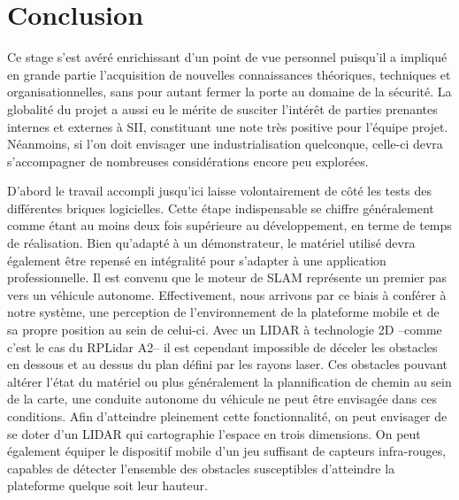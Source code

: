 \chapter*{Conclusion}

Ce stage s'est avéré enrichissant d'un point de vue personnel puisqu'il a impliqué en grande partie l'acquisition de nouvelles connaissances théoriques, techniques et organisationnelles, sans pour autant fermer la porte au 
domaine de la sécurité. 
La globalité du projet a aussi eu le mérite de susciter l'intérêt de parties prenantes internes et externes à SII, constituant une note très positive pour l'équipe projet. 
Néanmoins, si l'on doit envisager une industrialisation quelconque, celle-ci devra s'accompagner de nombreuses considérations encore peu explorées. 

D'abord le travail accompli jusqu'ici laisse volontairement de côté les tests des différentes briques logicielles.  
Cette étape indispensable se chiffre généralement comme étant au moins deux fois supérieure au développement, en terme de temps de réalisation.
Bien qu'adapté à un démonstrateur, le matériel utilisé devra également être repensé en intégralité pour s'adapter à une application professionnelle. 
Il est convenu que le moteur de SLAM représente un premier pas vers un véhicule autonome.
Effectivement, nous arrivons par ce biais à conférer à notre système, une perception de l'environnement de la plateforme mobile et de sa propre position au sein de celui-ci.    
Avec un LIDAR à technologie 2D --comme c'est le cas du RPLidar A2-- il est cependant impossible de déceler les obstacles en dessous et au dessus du plan défini par les rayons laser. 
Ces obstacles pouvant altérer l'état du matériel ou plus généralement la plannification de chemin au sein de la carte, une conduite autonome du véhicule ne peut être envisagée dans ces conditions.   
Afin d'atteindre pleinement cette fonctionnalité, on peut envisager de se doter d'un LIDAR qui cartographie l'espace en trois dimensions. 
On peut également équiper le dispositif mobile d'un jeu suffisant de capteurs infra-rouges, capables de détecter l'ensemble des obstacles susceptibles d'atteindre la plateforme quelque soit leur hauteur. 

